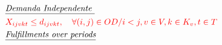\begin{align}
	 & \textit{\underline{Demanda Independente  }}         \notag                                                                                                                                                                                                                                 \\
	 & \textcolor{red}{X_{ijvkt} \leq d_{ijvkt},  \quad \forall (i,j) \in OD / i < j  ,v \in V, k \in K_v, t\in T }                                                                                                 \label{eq: m1_assig_menor_dem}                                                 \\
	 & \textit{\underline{Fulfillments over periods} }   \notag                                                                                                                                                                                                                                    \\

\end{align}
